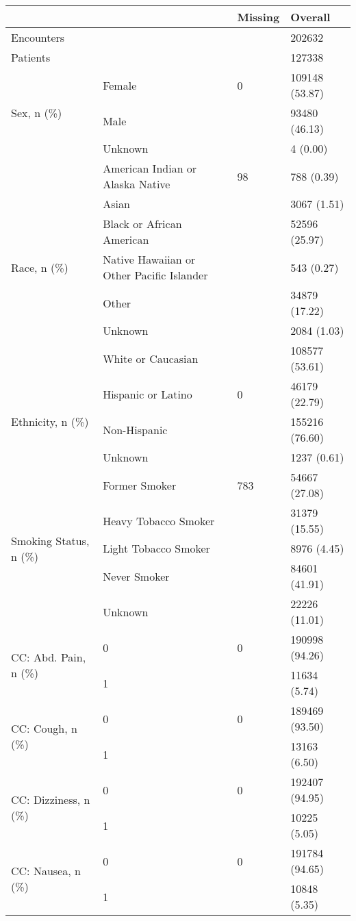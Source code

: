 \begin{tabular}{llll}
\toprule
 &  & Missing & Overall \\
\midrule
Encounters &  &  & 202632 \\
Patients &  &  & 127338 \\
\cline{1-4}
\multirow[t]{3}{*}{Sex, n (\%)} & Female & 0 & 109148 (53.87) \\
 & Male &  & 93480 (46.13) \\
 & Unknown &  & 4 (0.00) \\
\cline{1-4}
\multirow[t]{7}{*}{Race, n (\%)} & American Indian or Alaska Native & 98 & 788 (0.39) \\
 & Asian &  & 3067 (1.51) \\
 & Black or African American &  & 52596 (25.97) \\
 & Native Hawaiian or Other Pacific Islander &  & 543 (0.27) \\
 & Other &  & 34879 (17.22) \\
 & Unknown &  & 2084 (1.03) \\
 & White or Caucasian &  & 108577 (53.61) \\
\cline{1-4}
\multirow[t]{3}{*}{Ethnicity, n (\%)} & Hispanic or Latino & 0 & 46179 (22.79) \\
 & Non-Hispanic &  & 155216 (76.60) \\
 & Unknown &  & 1237 (0.61) \\
\cline{1-4}
\multirow[t]{5}{*}{Smoking Status, n (\%)} & Former Smoker & 783 & 54667 (27.08) \\
 & Heavy Tobacco Smoker &  & 31379 (15.55) \\
 & Light Tobacco Smoker &  & 8976 (4.45) \\
 & Never Smoker &  & 84601 (41.91) \\
 & Unknown &  & 22226 (11.01) \\
\cline{1-4}
\multirow[t]{2}{*}{CC: Abd. Pain, n (\%)} & 0 & 0 & 190998 (94.26) \\
 & 1 &  & 11634 (5.74) \\
\cline{1-4}
\multirow[t]{2}{*}{CC: Cough, n (\%)} & 0 & 0 & 189469 (93.50) \\
 & 1 &  & 13163 (6.50) \\
\cline{1-4}
\multirow[t]{2}{*}{CC: Dizziness, n (\%)} & 0 & 0 & 192407 (94.95) \\
 & 1 &  & 10225 (5.05) \\
\cline{1-4}
\multirow[t]{2}{*}{CC: Nausea, n (\%)} & 0 & 0 & 191784 (94.65) \\
 & 1 &  & 10848 (5.35) \\

\end{tabular}
